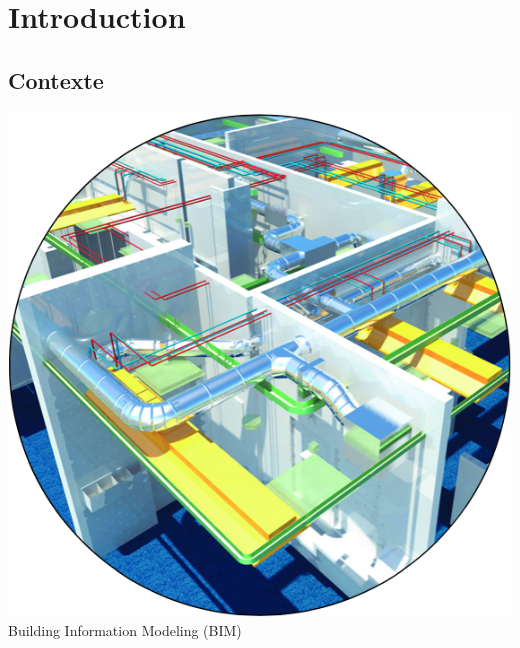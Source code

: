 \section{Introduction}

\subsection{Contexte}
\begin{frame}{}

{\small 
	\begin{minipage}{.3\textwidth}
		\centering
		\includegraphics[width=\textwidth]{img/bim2.png}\\
		Building Information Modeling (BIM)
	\end{minipage}
	\hfill
	\begin{minipage}{.3\textwidth}
		\centering

\end{minipage}}
\end{frame}
